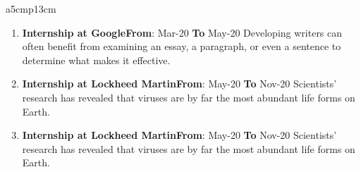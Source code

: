 \documentclass{article}
\begin{document}
{\begin{longtable}{ a{5cm}p{13cm} }
\begin{enumerate}
	\item {\textbf{Internship at Google}}\hfill {\textbf{From}}: Mar-20 {\textbf{To}} May-20\newline
	Developing writers can often benefit from examining an essay, a paragraph, or even a sentence to determine what makes it effective.
	\item {\textbf{Internship at Lockheed Martin}}\hfill {\textbf{From}}: May-20 {\textbf{To}} Nov-20\newline
	 Scientists' research has revealed that viruses are by far the most abundant life forms on Earth. 
	 \item {\textbf{Internship at Lockheed Martin}}\hfill {\textbf{From}}: May-20 {\textbf{To}} Nov-20\newline
	 Scientists' research has revealed that viruses are by far the most abundant life forms on Earth.
	 
\end{enumerate}


\end{longtable} }
\end{document}
